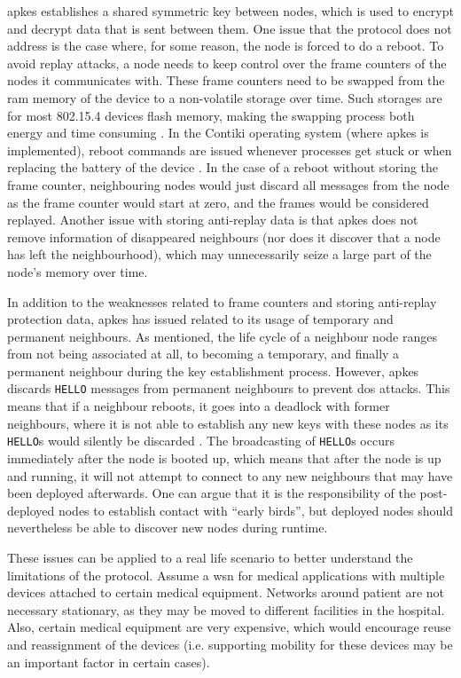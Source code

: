 \gls{apkes} establishes a shared symmetric key between nodes, which is used to encrypt and decrypt data that is sent between them. One issue that the protocol does not address is the case where, for some reason, the node is forced to do a reboot. To avoid replay attacks, a node needs to keep control over the frame counters of the nodes it communicates with. These frame counters need to be swapped from the \gls{ram} memory of the device to a non-volatile storage over time. Such storages are for most 802.15.4 devices flash memory, making the swapping process both energy and time consuming \cite{krentz2015handling}. In the Contiki operating system (where \gls{apkes} is implemented), reboot commands are issued whenever processes get stuck or when replacing the battery of the device \cite{dunkels2004contiki}. In the case of a reboot without storing the frame counter, neighbouring nodes would just discard all messages from the node as the frame counter would start at zero, and the frames would be considered replayed. Another issue with storing anti-replay data is that \gls{apkes} does not remove information of disappeared neighbours (nor does it discover that a node has left the neighbourhood), which may unnecessarily seize a large part of the node's memory over time.  

In addition to the weaknesses related to frame counters and storing anti-replay protection data, \gls{apkes} has issued related to its usage of temporary and permanent neighbours. As mentioned, the life cycle of a neighbour node ranges from not being associated at all, to becoming a temporary, and finally a permanent neighbour during the key establishment process. However, \gls{apkes} discards \texttt{HELLO} messages from permanent neighbours to prevent \gls{dos} attacks. This means that if a neighbour reboots, it goes into a deadlock with former neighbours, where it is not able to establish any new keys with these nodes as its \texttt{HELLO}s would silently be discarded \cite{krentz2015handling}. The broadcasting of \texttt{HELLO}s occurs immediately after the node is booted up, which means that after the node is up and running, it will not attempt to connect to any new neighbours that may have been deployed afterwards. One can argue that it is the responsibility of the post-deployed nodes to establish contact with ``early birds'', but deployed nodes should nevertheless be able to discover new nodes during runtime. 

These issues can be applied to a real life scenario to better understand the limitations of the protocol. Assume a \gls{wsn} for medical applications with multiple devices attached to certain medical equipment. Networks around patient are not necessary stationary, as they may be moved to different facilities in the hospital. Also, certain medical equipment are very expensive, which would encourage reuse and reassignment of the devices (i.e. supporting mobility for these devices may be an important factor in certain cases). 



